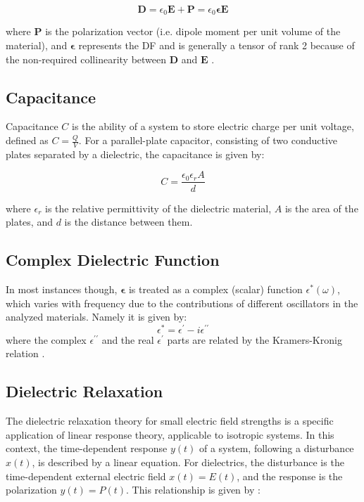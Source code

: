 \[
	\mathbf{D} = \epsilon_0 \mathbf{E} + \mathbf{P} = \epsilon_0 \boldsymbol{\epsilon} \mathbf{E}
\]

where \( \mathbf{P} \) is the polarization vector (i.e. dipole moment per unit volume of the material), and \( \boldsymbol{\epsilon} \) represents the \ac{DF}
and is generally a tensor of rank 2 because of the non-required collinearity between \( \mathbf{D} \) and \( \mathbf{E} \) \cite{grundmann2021}.


\subsection{Capacitance}

Capacitance \(C\) is the ability of a system to store electric charge per unit voltage, defined as \(C = \frac{Q}{V}\). For a parallel-plate capacitor, consisting of two conductive plates separated by a dielectric, the capacitance is given by:

\begin{equation}
\label{parallelplate}
C = \frac{\epsilon_0 \epsilon_r A}{d}
\end{equation}

where \( \epsilon_r \) is the relative permittivity of the dielectric material, \( A \) is the area of the plates, and \( d \) is the distance between them.

\subsection{Complex Dielectric Function}


In most instances though, \(\boldsymbol{ \epsilon }\) is treated as a complex (scalar) function \( \epsilon^*(\omega) \), which varies with frequency due to the contributions of different oscillators in the analyzed materials. Namely it is given by: \[
	\epsilon^* = \epsilon^\prime - i \epsilon^{\prime \prime}
\]
where the complex $\epsilon^{\prime \prime}$ and the real $\epsilon^\prime$ parts are related by the Kramers-Kronig relation \cite{booij1982}.

\subsection{Dielectric Relaxation}

The dielectric relaxation theory for small electric field strengths is a specific application of linear response theory, applicable to isotropic systems. In this context, the time-dependent response \( y(t) \) of a system, following a disturbance \( x(t) \), is described by a linear equation. For dielectrics, the disturbance is the time-dependent external electric field \( x(t) = E(t) \), and the response is the polarization \( y(t) = P(t) \). This relationship is given by \cite{kremer2003}:

